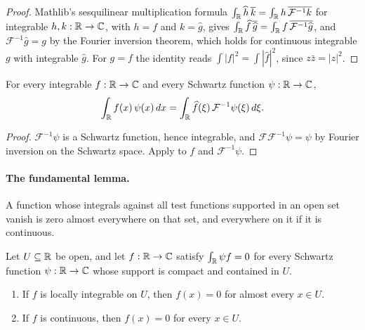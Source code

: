 \begin{proof}
\leanok
Mathlib's sesquilinear multiplication formula
$\int_{\mathbb{R}} \widehat h \, \overline{k} = \int_{\mathbb{R}} h \, \overline{\mathcal F^{-1} k}$ for integrable
$h, k : \mathbb{R} \to \mathbb{C}$, with $h = f$ and $k = \widehat g$, gives
$\int_{\mathbb{R}} \widehat f \, \overline{\widehat g} = \int_{\mathbb{R}} f \, \overline{\mathcal F^{-1} \widehat g}$,
and $\mathcal F^{-1} \widehat g = g$ by the Fourier inversion theorem, which holds for
continuous integrable $g$ with integrable $\widehat g$. For $g = f$ the identity reads
$\int |f|^2 = \int |\widehat f|^2$, since $z \bar z = |z|^2$.
\end{proof}

\begin{lemma}
\label{lem:daub-fourier-schwartz}
\leanok
For every integrable $f : \mathbb{R} \to \mathbb{C}$ and every Schwartz function $\psi : \mathbb{R} \to \mathbb{C}$,
\[
  \int_{\mathbb{R}} f(x) \, \psi(x) \, dx = \int_{\mathbb{R}} \widehat f(\xi) \, \mathcal F^{-1} \psi(\xi) \, d\xi .
\]
\end{lemma}

\begin{proof}
\leanok
{}
$\mathcal F^{-1} \psi$ is a Schwartz function, hence integrable, and
$\mathcal F \mathcal F^{-1} \psi = \psi$ by Fourier inversion on the Schwartz space. Apply
 to $f$ and $\mathcal F^{-1} \psi$.
\end{proof}

\paragraph{The fundamental lemma.}
A function whose integrals against all test functions supported in an open set vanish is zero
almost everywhere on that set, and everywhere on it if it is continuous.

\begin{proposition}
\label{prop:daub-fundamental-lemma}
\leanok
Let $U \subseteq \mathbb{R}$ be open, and let $f : \mathbb{R} \to \mathbb{C}$ satisfy $\int_{\mathbb{R}} \psi f = 0$ for every
Schwartz function $\psi : \mathbb{R} \to \mathbb{C}$ whose support is compact and contained in $U$.
\begin{enumerate}
  \item If $f$ is locally integrable on $U$, then $f(x) = 0$ for almost every $x \in U$.
  \item If $f$ is continuous, then $f(x) = 0$ for every $x \in U$.
\end{enumerate}
\end{proposition}


